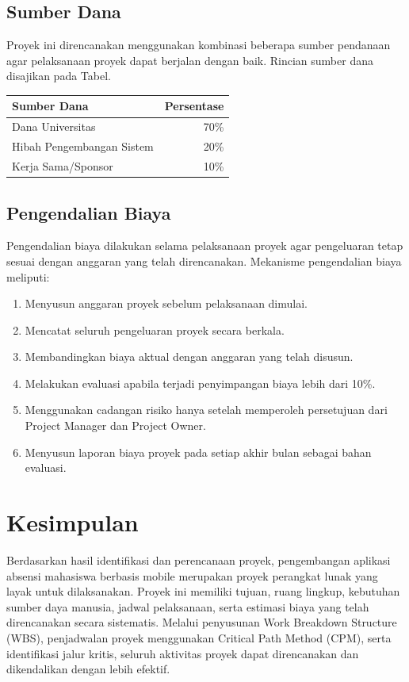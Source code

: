 \documentclass[12pt,a4paper]{article}
\begin{document}
\subsection{Sumber Dana}

Proyek ini direncanakan menggunakan kombinasi beberapa sumber pendanaan agar pelaksanaan proyek dapat berjalan dengan baik. Rincian sumber dana disajikan pada Tabel.

\begin{table}[H]
\centering
\begin{tabular}{lr}
\toprule
\textbf{Sumber Dana} & \textbf{Persentase}\\
\midrule
Dana Universitas & 70\%\\
Hibah Pengembangan Sistem & 20\%\\
Kerja Sama/Sponsor & 10\%\\
\bottomrule
\end{tabular}
\end{table}

\subsection{Pengendalian Biaya}

Pengendalian biaya dilakukan selama pelaksanaan proyek agar pengeluaran tetap sesuai dengan anggaran yang telah direncanakan. Mekanisme pengendalian biaya meliputi:

\begin{enumerate}
\item Menyusun anggaran proyek sebelum pelaksanaan dimulai.
\item Mencatat seluruh pengeluaran proyek secara berkala.
\item Membandingkan biaya aktual dengan anggaran yang telah disusun.
\item Melakukan evaluasi apabila terjadi penyimpangan biaya lebih dari 10\%.
\item Menggunakan cadangan risiko hanya setelah memperoleh persetujuan dari Project Manager dan Project Owner.
\item Menyusun laporan biaya proyek pada setiap akhir bulan sebagai bahan evaluasi.
\end{enumerate}

\section{Kesimpulan}

Berdasarkan hasil identifikasi dan perencanaan proyek, pengembangan aplikasi absensi mahasiswa berbasis mobile merupakan proyek perangkat lunak yang layak untuk dilaksanakan. Proyek ini memiliki tujuan, ruang lingkup, kebutuhan sumber daya manusia, jadwal pelaksanaan, serta estimasi biaya yang telah direncanakan secara sistematis. Melalui penyusunan Work Breakdown Structure (WBS), penjadwalan proyek menggunakan Critical Path Method (CPM), serta identifikasi jalur kritis, seluruh aktivitas proyek dapat direncanakan dan dikendalikan dengan lebih efektif.
\end{document}
